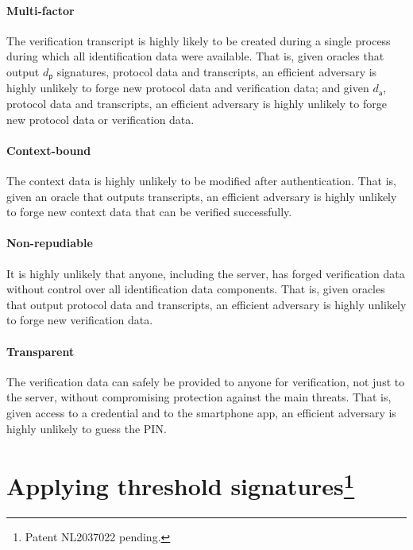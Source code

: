 \documentclass[a4paper]{article}
\begin{document}
\paragraph{Multi-factor}

The verification transcript is highly likely to be created during a single process during which all identification data were available. That is, given oracles that output $d_\mathsf{p}$ signatures, protocol data and transcripts, an efficient adversary is highly unlikely to forge new protocol data and verification data; and given $d_\mathsf{a}$, protocol data and transcripts, an efficient adversary is highly unlikely to forge new protocol data or verification data.

\paragraph{Context-bound}

The context data is highly unlikely to be modified after authentication. That is, given an oracle that outputs transcripts, an efficient adversary is highly unlikely to forge new context data that can be verified successfully.

\paragraph{Non-repudiable}

It is highly unlikely that anyone, including the server, has forged verification data without control over all identification data components. That is, given oracles that output protocol data and transcripts, an efficient adversary is highly unlikely to forge new verification data.

\paragraph{Transparent}

The verification data can safely be provided to anyone for verification, not just to the server, without compromising protection against the main threats. That is, given access to a credential and to the smartphone app, an efficient adversary is highly unlikely to guess the PIN.

\section{Applying threshold signatures\footnote{Patent NL2037022 pending.}}
\end{document}
